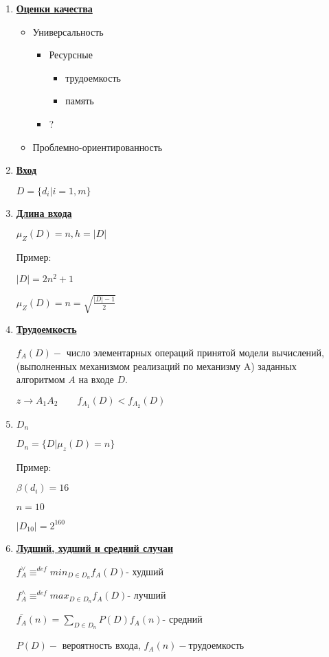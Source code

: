 \documentclass[12pt]{report}
\begin{document}
	\begin{enumerate}
		\item\underline{\textbf{Оценки качества}}
		\begin{itemize}
			\item Универсальность
			\begin{itemize}
				\item Ресурсные
				\begin{itemize}
					\item трудоемкость
					\item память
				\end{itemize}
				\item ?
			\end{itemize}
			\item Проблемно-ориентированность
		\end{itemize}
	
		\item\underline{\textbf{Вход}}\par
		$D = \{d_{i} | i=1,m\}$
		
		\item\underline{\textbf{Длина входа}}\par
		$\mu_{Z}(D) = n, h = |D|$\par
		Пример:\par $|D| = 2n^{2} + 1$\par
		$\mu_{Z}(D) = n = \sqrt{\frac{|D| - 1}{2}}$
		
		\item\underline{\textbf{Трудоемкость}}\par
		$f_{A}(D) -$ число элементарных операций принятой модели вычислений, (выполненных механизмом реализаций по механизму A) заданных алгоритмом $A$ на входе $D$.\par
		$z\rightarrow A_{1}A_{2} \qquad f_{A_{1}}(D) < f_{A_{2}}(D)$\par 
		
		\item\underline{\textbf{$D_{n}$}}\par
		$D_{n} = \{D | \mu_{z}(D)=n\}$\par
		Пример:\par
		$\beta(d_{i})=16$\par
		$n=10$\par
		$|D_{10}|=2^{160}$
		
		\item\underline{\textbf{Лудший, худший и средний случаи}}\par
		$f_{A}^{\vee} \equiv^{def} min_{D \in D_{n}} f_{A}(D)$\qquad - худший\par
		$f_{A}^{\wedge} \equiv^{def} max_{D \in D_{n}} f_{A}(D)$\qquad - лучший\par
		$\bar{f_{A}}(n) = \sum_{D \in D_{n}}P(D)f_{A}(n) $\qquad - средний\par
		$P(D) -$ вероятность входа, $f_{A}(n) -$трудоемкость
		

\end{enumerate}
\end{document}
